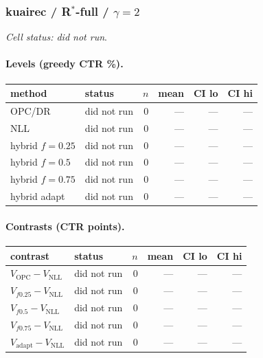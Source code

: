 \documentclass[10pt,a4paper]{article}
\begin{document}
\subsubsection{kuairec / R$^*$-full / $\gamma=2$}
\emph{Cell status: did not run}.
\paragraph{Levels (greedy CTR \%).}
{\centering\small\begin{tabular}{llrrrr}
\toprule method & status & $n$ & mean & CI lo & CI hi \\
\midrule
OPC/DR & did not run & 0 & --- & --- & --- \\
NLL & did not run & 0 & --- & --- & --- \\
hybrid $f{=}0.25$ & did not run & 0 & --- & --- & --- \\
hybrid $f{=}0.5$ & did not run & 0 & --- & --- & --- \\
hybrid $f{=}0.75$ & did not run & 0 & --- & --- & --- \\
hybrid adapt & did not run & 0 & --- & --- & --- \\
\bottomrule\end{tabular}\par}
\paragraph{Contrasts (CTR points).}
{\centering\small\begin{tabular}{llrrrr}
\toprule contrast & status & $n$ & mean & CI lo & CI hi \\
\midrule
$V_{\mathrm{OPC}}-V_{\mathrm{NLL}}$ & did not run & 0 & --- & --- & --- \\
$V_{f0.25}-V_{\mathrm{NLL}}$ & did not run & 0 & --- & --- & --- \\
$V_{f0.5}-V_{\mathrm{NLL}}$ & did not run & 0 & --- & --- & --- \\
$V_{f0.75}-V_{\mathrm{NLL}}$ & did not run & 0 & --- & --- & --- \\
$V_{\mathrm{adapt}}-V_{\mathrm{NLL}}$ & did not run & 0 & --- & --- & --- \\
\bottomrule\end{tabular}\par}
\end{document}
